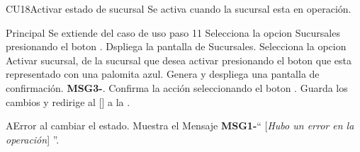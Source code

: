 \begin{UseCase}{CU18}{Activar estado de sucursal}{
		Se activa cuando la sucursal esta en operación.
	}
	\end{UseCase}




	\begin{UCtrayectoria}{Principal}
		\UCpaso Se extiende del caso de uso  paso 11
		\UCpaso[\UCactor] Selecciona la opcion Sucursales presionando el boton .
		\UCpaso Dspliega la pantalla de Sucursales.
		\UCpaso[\UCactor] Selecciona la opcion Activar sucursal, de la sucursal que desea activar presionando el boton  que esta representado con una palomita azul.		
		\UCpaso Genera y despliega una pantalla de confirmación.  {\bf MSG3-}.
		\UCpaso[\UCactor] Confirma la acción seleccionando el boton . 
		\UCpaso Guarda los cambios y redirige al [\UCactor] a la  .
	\end{UCtrayectoria}




\begin{UCtrayectoriaA}{A}{Error al cambiar el estado.}
			\UCpaso Muestra el Mensaje {\bf MSG1-}`` [{\em Hubo un error en la operación}] ''.
			
		\end{UCtrayectoriaA}

